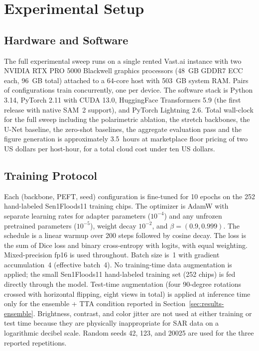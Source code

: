 \documentclass[conference]{IEEEtran}
\begin{document}
\section{Experimental Setup}
\label{sec:setup}

\subsection{Hardware and Software}

The full experimental sweep runs on a single rented Vast.ai instance with two NVIDIA RTX PRO 5000 Blackwell graphics processors (48~GB GDDR7 ECC each, 96~GB total) attached to a 64-core host with 503~GB system RAM. Pairs of configurations train concurrently, one per device. The software stack is Python 3.14, PyTorch 2.11 with CUDA 13.0, HuggingFace Transformers 5.9 (the first release with native SAM~2 support), and PyTorch Lightning 2.6. Total wall-clock for the full sweep including the polarimetric ablation, the stretch backbones, the U-Net baseline, the zero-shot baselines, the aggregate evaluation pass and the figure generation is approximately 3.5~hours at marketplace floor pricing of two US dollars per host-hour, for a total cloud cost under ten US dollars.

\subsection{Training Protocol}

Each (backbone, PEFT, seed) configuration is fine-tuned for 10 epochs on the 252 hand-labeled Sen1Floods11 training chips. The optimizer is AdamW with separate learning rates for adapter parameters ($10^{-4}$) and any unfrozen pretrained parameters ($10^{-5}$), weight decay $10^{-2}$, and $\beta = (0.9, 0.999)$. The schedule is a linear warmup over 200 steps followed by cosine decay. The loss is the sum of Dice loss and binary cross-entropy with logits, with equal weighting. Mixed-precision fp16 is used throughout. Batch size is~1 with gradient accumulation~4 (effective batch~4). No training-time data augmentation is applied; the small Sen1Floods11 hand-labeled training set (252 chips) is fed directly through the model. Test-time augmentation (four 90-degree rotations crossed with horizontal flipping, eight views in total) is applied at inference time only for the ensemble + TTA condition reported in Section~\ref{sec:results-ensemble}. Brightness, contrast, and color jitter are not used at either training or test time because they are physically inappropriate for SAR data on a logarithmic decibel scale. Random seeds 42, 123, and 20025 are used for the three reported repetitions.
\end{document}
